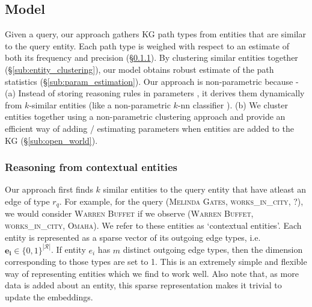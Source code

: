 \documentclass[11pt,a4paper]{article}
\begin{document}
\subsection{Model}
\label{sub:non_param_reasoning}

Given a query, our approach gathers KG path types from entities that are similar to the query entity. Each path type is weighed with respect to an estimate of both its frequency and precision (\S\ref{sub:contextual_entities}). By clustering similar entities together (\S\ref{sub:entity_clustering}), our model obtains robust estimate of the path statistics (\S\ref{sub:param_estimation}). Our approach is non-parametric because - (a) Instead of storing reasoning rules in parameters \cite{das2018go,minervini2019differentiable}, it derives them dynamically from $k$-similar entities (like  a non-parametric $k$-nn classifier \cite{cover1967nearest}). (b) We cluster entities together using a non-parametric clustering approach and provide an efficient way of adding / estimating parameters when entities are added to the KG (\S\ref{sub:open_world}).

\subsubsection{Reasoning from contextual entities}
\label{sub:contextual_entities}
Our approach first finds $k$ similar entities to the  query entity that have atleast an edge of type $r_q$. For example, for the query (\textsc{Melinda Gates}, \textsc{works\_in\_city}, ?), we would consider \textsc{Warren Buffet} if we observe (\textsc{Warren Buffet}, \textsc{works\_in\_city}, \textsc{Omaha}). We refer to these entities as `contextual entities'.  Each entity is represented as a sparse vector of its outgoing edge types, i.e. $\mathbf{e_i} \in \{0,1\}^{|\mathcal{R}|}$. If entity $e_i$ has $m$ distinct outgoing edge types, then the dimension corresponding to those types are set to 1. This is an extremely simple and flexible way of representing entities which we find to work well. Also note that, as more data is added about an entity, this sparse representation makes it trivial to update the embeddings.
\end{document}
